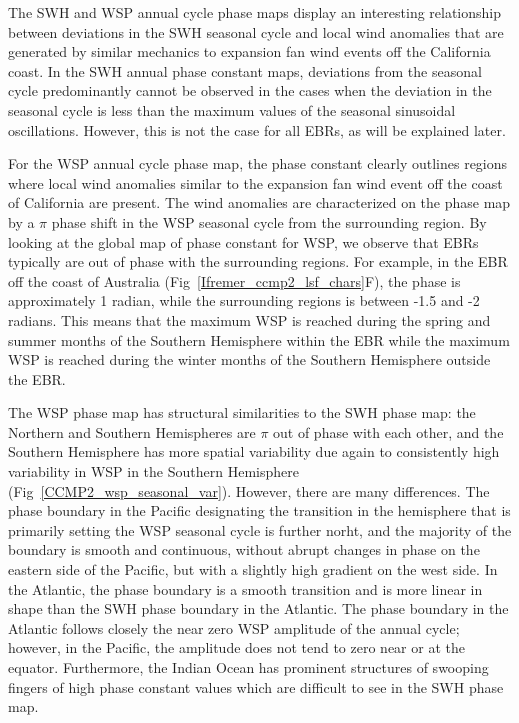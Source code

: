 \documentclass[draft,linenumbers]{agujournal2018}
\begin{document}
The SWH and WSP annual cycle phase maps display an interesting relationship between deviations in the SWH seasonal cycle and local wind anomalies that are generated by similar mechanics to expansion fan wind events off the California coast. In the SWH annual phase constant maps, deviations from the seasonal cycle predominantly cannot be observed in the cases when the deviation in the seasonal cycle is less than the maximum values of the seasonal sinusoidal oscillations. However, this is not the case for all EBRs, as will be explained later.  

For the WSP annual cycle phase map, the phase constant clearly outlines regions where local wind anomalies similar to the expansion fan wind event off the coast of California are present. The wind anomalies are characterized on the phase map by a $\pi$ phase shift in the WSP seasonal cycle from the surrounding region. By looking at the global map of phase constant for WSP, we observe that EBRs typically are out of phase with the surrounding regions. For example, in the EBR off the coast of Australia (Fig~\ref{Ifremer_ccmp2_lsf_chars}F), the phase is approximately 1 radian, while the surrounding regions is between -1.5 and -2 radians. This means that the maximum WSP is reached during the spring and summer months of the Southern Hemisphere within the EBR while the maximum WSP is reached during the winter months of the Southern Hemisphere outside the EBR. 

The WSP phase map has structural similarities to the SWH phase map: the Northern and Southern Hemispheres are $\pi$ out of phase with each other, and the Southern Hemisphere has more spatial variability due again to consistently high variability in WSP in the Southern Hemisphere  (Fig~\ref{CCMP2_wsp_seasonal_var}). However, there are many differences. The phase boundary in the Pacific designating the transition in the hemisphere that is primarily setting the WSP seasonal cycle is further norht, and the majority of the boundary is smooth and continuous, without abrupt changes in phase on the eastern side of the Pacific, but with a slightly high gradient on the west side. In the Atlantic, the phase boundary is a smooth transition and is more linear in shape than the SWH phase boundary in the Atlantic. The phase boundary in the Atlantic follows closely the near zero WSP amplitude of the annual cycle; however, in the Pacific, the amplitude does not tend to zero near or at the equator. Furthermore, the Indian Ocean has prominent structures of swooping fingers of high phase constant values which are difficult to see in the SWH phase map. 
\end{document}
